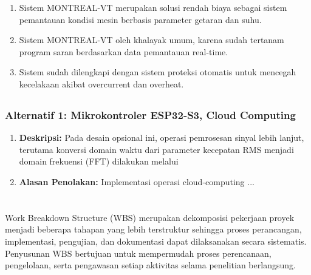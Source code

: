 \documentclass{elsinta}
\begin{document}
\begin{enumerate}
    \item Sistem MONTREAL-VT merupakan solusi rendah biaya sebagai sistem pemantauan kondisi mesin berbasis parameter getaran dan suhu.
    \item Sistem MONTREAL-VT oleh khalayak umum, karena sudah tertanam program saran berdasarkan data pemantauan real-time.
    \item Sistem sudah dilengkapi dengan sistem proteksi otomatis untuk mencegah kecelakaan akibat overcurrent dan overheat.
\end{enumerate}

\subsection{\AlternativeDesignTitle}

\subsection{\JustificationTitle}

\subsubsection*{Alternatif 1: Mikrokontroler ESP32-S3, Cloud Computing}
\begin{enumerate}
    \item \textbf{Deskripsi:} Pada desain opsional ini, operasi pemrosesan sinyal lebih lanjut, terutama
    konversi domain waktu dari parameter kecepatan RMS menjadi domain frekuensi (FFT) dilakukan
    melalui 
    \item \textbf{Alasan Penolakan:} Implementasi operasi cloud-computing ...
\end{enumerate} 

\newpage
\section{\ImplementationPlanTitle}

Work Breakdown Structure (WBS) merupakan dekomposisi pekerjaan proyek menjadi beberapa tahapan yang lebih terstruktur sehingga proses perancangan, implementasi, pengujian, dan dokumentasi dapat dilaksanakan secara sistematis. Penyusunan WBS bertujuan untuk mempermudah proses perencanaan, pengelolaan, serta pengawasan setiap aktivitas selama penelitian berlangsung.
\end{document}
